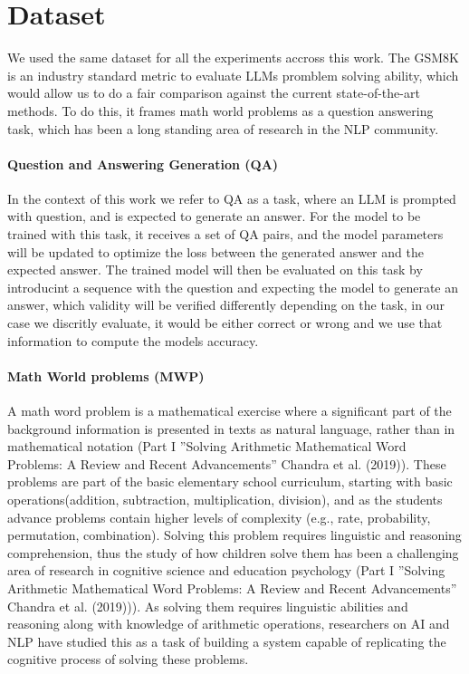 \documentclass[a4paper,10pt]{article}
\title{}
\author{Jose Rodriguez}
\begin{document}
\maketitle

\begin{abstract}

\end{abstract}

\section{Dataset}
We used the same dataset for all the experiments accross this work. The GSM8K is an industry standard metric to evaluate LLMs promblem solving ability, which would allow us to do a fair comparison against the current state-of-the-art methods. To do this, it frames math world problems as a question answering task, which has been a long standing area of research in the NLP community. 

\paragraph{Question and Answering Generation (QA)}
In the context of this work we refer to QA as a task, where an LLM is prompted with question, and is expected to generate an answer. For the model to be trained with this task, it receives  a set of QA pairs, and the model parameters will be updated to optimize the loss between the generated answer and the expected answer. The trained model will then be evaluated on this task by introducint a sequence with the question and expecting the model to generate an answer, which validity will be verified differently depending on the task, in our case we discritly evaluate, it would be either correct or wrong and we use that information to compute the models accuracy.
\paragraph{Math World problems (MWP)}
A math word problem is a mathematical exercise where a significant part of the background information is presented in texts as natural language, rather than in mathematical notation (Part I ”Solving Arithmetic Mathematical Word Problems: A Review and Recent Advancements” Chandra et al. (2019)). These problems are part of the basic elementary school curriculum, starting with basic operations(addition, subtraction, multiplication, division), and as the students advance problems contain higher levels of complexity (e.g., rate, probability, permutation, combination). Solving this problem requires linguistic and reasoning comprehension, thus the study of how children solve them has been a challenging area of research in cognitive science and education psychology (Part I ”Solving Arithmetic Mathematical Word Problems: A Review and Recent Advancements” Chandra et al. (2019))). As solving them requires linguistic abilities and reasoning along with knowledge of arithmetic operations, researchers on AI and NLP have studied this as a task of building a system capable of replicating the cognitive process of solving these problems. 
\end{document}
